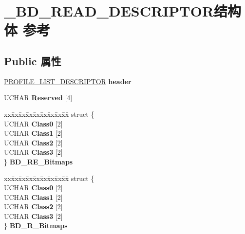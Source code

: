 \hypertarget{struct___b_d___r_e_a_d___d_e_s_c_r_i_p_t_o_r}{}\section{\+\_\+\+B\+D\+\_\+\+R\+E\+A\+D\+\_\+\+D\+E\+S\+C\+R\+I\+P\+T\+O\+R结构体 参考}
\label{struct___b_d___r_e_a_d___d_e_s_c_r_i_p_t_o_r}
\subsection*{Public 属性}
\begin{DoxyCompactItemize}
\item 
\mbox{\label{struct___b_d___r_e_a_d___d_e_s_c_r_i_p_t_o_r_a8f9e13e56314f80f36f265beed75197b}} 
\hyperlink{struct___p_r_o_f_i_l_e___l_i_s_t___d_e_s_c_r_i_p_t_o_r}{P\+R\+O\+F\+I\+L\+E\+\_\+\+L\+I\+S\+T\+\_\+\+D\+E\+S\+C\+R\+I\+P\+T\+OR} {\bfseries header}
\item 
\mbox{\label{struct___b_d___r_e_a_d___d_e_s_c_r_i_p_t_o_r_a7e49620e6b5414b63828f06cf281c24e}} 
U\+C\+H\+AR {\bfseries Reserved} \mbox{[}4\mbox{]}
\item 
\mbox{\label{struct___b_d___r_e_a_d___d_e_s_c_r_i_p_t_o_r_a34d80cf1f2f8aceb8538e63babb543cd}} 
\begin{tabbing}
xx\=xx\=xx\=xx\=xx\=xx\=xx\=xx\=xx\=\kill
struct \{\\
\>UCHAR {\bfseries Class0} \mbox{[}2\mbox{]}\\
\>UCHAR {\bfseries Class1} \mbox{[}2\mbox{]}\\
\>UCHAR {\bfseries Class2} \mbox{[}2\mbox{]}\\
\>UCHAR {\bfseries Class3} \mbox{[}2\mbox{]}\\
\} {\bfseries BD\_RE\_Bitmaps}\\

\end{tabbing}\item 
\mbox{\label{struct___b_d___r_e_a_d___d_e_s_c_r_i_p_t_o_r_a88d506abdcbb9ef709c4f04f320f3a15}} 
\begin{tabbing}
xx\=xx\=xx\=xx\=xx\=xx\=xx\=xx\=xx\=\kill
struct \{\\
\>UCHAR {\bfseries Class0} \mbox{[}2\mbox{]}\\
\>UCHAR {\bfseries Class1} \mbox{[}2\mbox{]}\\
\>UCHAR {\bfseries Class2} \mbox{[}2\mbox{]}\\
\>UCHAR {\bfseries Class3} \mbox{[}2\mbox{]}\\
\} {\bfseries BD\_R\_Bitmaps}\\


\end{tabbing}
\end{DoxyCompactItemize}
